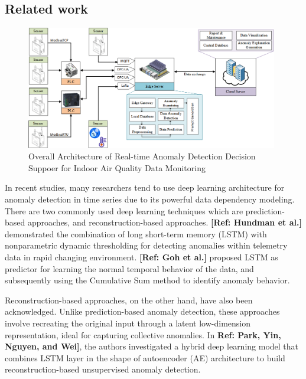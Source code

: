 \documentclass[final,3p,times,twocolumn]{elsarticle}
\begin{document}
\subsection{Related work}
\begin{figure}[t]
	\centering
	\includegraphics[width=11cm]{Architecture} 
	\caption[width=0.5\paperwidth]{Overall Architecture of Real-time Anomaly Detection Decision Suppoer for Indoor Air Quality Data Monitoring}\label{fig:architecture}
\end{figure}
In recent studies, many researchers tend to use deep learning architecture for anomaly detection in time series due to its powerful data dependency modeling. There are two commonly used deep learning techniques which are prediction-based approaches, and reconstruction-based approaches. \textbf{[Ref: Hundman et al.]} demonstrated the combination of long short-term memory (LSTM) with nonparametric dynamic thresholding for detecting anomalies within telemetry data in rapid changing environment. \textbf{[Ref: Goh et al.]} proposed LSTM as predictor for learning the normal temporal behavior of the data, and subsequently using the Cumulative Sum method to identify anomaly behavior. 

Reconstruction-based approaches, on the other hand, have also been acknowledged. Unlike prediction-based anomaly detection, these approaches involve recreating the original input through a latent low-dimension representation, ideal for capturing collective anomalies. In \textbf{Ref: Park, Yin, Nguyen, and Wei]}, the authors investigated a hybrid deep learning model that combines LSTM layer in the  shape of autoencoder (AE) architecture to build reconstruction-based unsupervised anomaly detection. 
\end{document}
